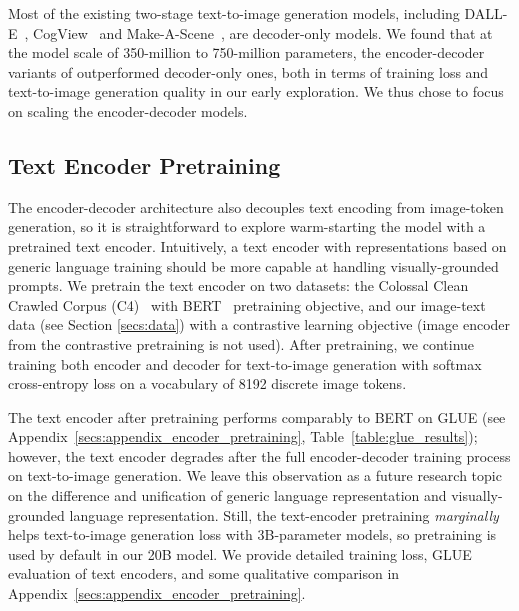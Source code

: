 Most of the existing two-stage text-to-image generation models, including DALL-E~\cite{ramesh2021zero}, CogView~\cite{ding2021cogview} and Make-A-Scene~\cite{gafni2022make}, are decoder-only models. We found that at the model scale of 350-million to 750-million parameters, the encoder-decoder variants of \bdraw outperformed decoder-only ones, both in terms of training loss and text-to-image generation quality in our early exploration. We thus chose to focus on scaling the encoder-decoder models.

\subsection{Text Encoder Pretraining}
The encoder-decoder architecture also decouples text encoding from image-token generation, so it is straightforward to explore warm-starting the model with a pretrained text encoder. Intuitively, a text encoder with representations based on generic language training should be more capable at handling visually-grounded prompts. We pretrain the text encoder on two datasets: the Colossal Clean Crawled Corpus (C4)~\cite{raffel2019exploring} with BERT~\cite{devlin2018bert} pretraining objective, and our image-text data (see Section \ref{secs:data}) with a contrastive learning objective (image encoder from the contrastive pretraining is not used). After pretraining, we continue training both encoder and decoder for text-to-image generation with softmax cross-entropy loss on a vocabulary of 8192 discrete image tokens.

The text encoder after pretraining performs comparably to BERT \cite{devlin2018bert} on GLUE (see Appendix~\ref{secs:appendix_encoder_pretraining}, Table~\ref{table:glue_results}); however, the text encoder degrades after the full encoder-decoder training process on text-to-image generation. We leave this observation as a future research topic on the difference and unification of generic language representation and visually-grounded language representation. Still, the text-encoder pretraining \textit{marginally} helps text-to-image generation loss with 3B-parameter \bdraw models, so pretraining is used by default in our 20B model. We provide detailed training loss, GLUE evaluation of text encoders, and some qualitative comparison in Appendix~\ref{secs:appendix_encoder_pretraining}.

